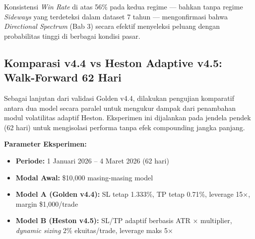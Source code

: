 Konsistensi \textit{Win Rate} di atas 56\% pada kedua regime --- bahkan tanpa regime \textit{Sideways} yang terdeteksi dalam dataset 7 tahun --- mengonfirmasi bahwa \textit{Directional Spectrum} (Bab 3) secara efektif menyeleksi peluang dengan probabilitas tinggi di berbagai kondisi pasar.

\subsection{Komparasi v4.4 vs Heston Adaptive v4.5: Walk-Forward 62 Hari}
\label{subsec:comparison_62d}

Sebagai lanjutan dari validasi Golden v4.4, dilakukan pengujian komparatif antara dua model secara paralel untuk mengukur dampak dari penambahan modul volatilitas adaptif Heston. Eksperimen ini dijalankan pada jendela pendek (62 hari) untuk mengisolasi performa tanpa efek compounding jangka panjang.

\textbf{Parameter Eksperimen:}
\begin{itemize}
    \item \textbf{Periode:} 1 Januari 2026 -- 4 Maret 2026 (62 hari)
    \item \textbf{Modal Awal:} \$10,000 masing-masing model
    \item \textbf{Model A (Golden v4.4):} SL tetap 1.333\%, TP tetap 0.71\%, leverage 15×, margin \$1,000/trade
    \item \textbf{Model B (Heston v4.5):} SL/TP adaptif berbasis ATR × multiplier, \textit{dynamic sizing} 2\% ekuitas/trade, leverage maks 5×
\end{itemize}

